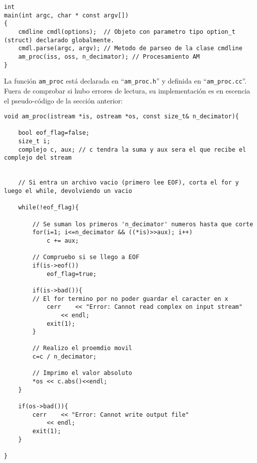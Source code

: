 \lstset{language=C++}
\begin{lstlisting}[frame=single]
int
main(int argc, char * const argv[])
{
	cmdline cmdl(options);	// Objeto con parametro tipo option_t (struct) declarado globalmente.
	cmdl.parse(argc, argv);	// Metodo de parseo de la clase cmdline
	am_proc(iss, oss, n_decimator);	// Procesamiento AM
}
\end{lstlisting}

La función \texttt{am\_proc} está declarada en ``\texttt{am\_proc.h}'' y definida en ``\texttt{am\_proc.cc}''. Fuera de comprobar si hubo errores de lectura, su implementación es en escencia el pseudo-código de la sección anterior:

\lstset{language=C++}
\begin{lstlisting}[frame=single]
void am_proc(istream *is, ostream *os, const size_t& n_decimator){
	
	bool eof_flag=false;
	size_t i;
	complejo c, aux; // c tendra la suma y aux sera el que recibe el complejo del stream	


	// Si entra un archivo vacio (primero lee EOF), corta el for y luego el while, devolviendo un vacio

	while(!eof_flag){
		
		// Se suman los primeros 'n_decimator' numeros hasta que corte 
		for(i=1; i<=n_decimator && ((*is)>>aux); i++)
			c += aux;
	
		// Compruebo si se llego a EOF
		if(is->eof())
			eof_flag=true;

		if(is->bad()){ 
		// El for termino por no poder guardar el caracter en x
			cerr	<< "Error: Cannot read complex on input stream"
				<< endl;
			exit(1);
		}		

		// Realizo el proemdio movil
		c=c / n_decimator;
			
		// Imprimo el valor absoluto
		*os << c.abs()<<endl;
	}
	
	if(os->bad()){
		cerr	<< "Error: Cannot write output file"
			<< endl;
		exit(1);
	}

}
\end{lstlisting}

